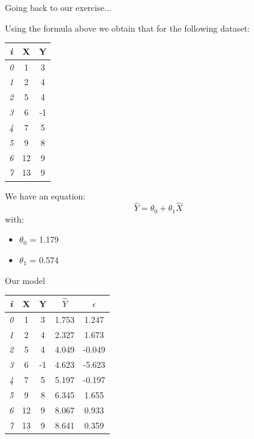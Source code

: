 \documentclass{beamer}
\begin{document}
\begin{frame}
{\centerline{Going back to our exercise... }}

Using the formula above we obtain that for the following dataset:

\begin{table}[h!]
\small
  \begin{center}
    \begin{tabular}{|c|c|c|}      
    \toprule
         \textit{i} & \textbf{X} & \textbf{Y} \\
    \midrule    \midrule
	\textit{0} &1 & 3 \\
	\textit{1} &2 & 4 \\
	\textit{2} &5 & 4 \\
	\textit{3} &6 & -1 \\
	\textit{4} &7 & 5 \\
	\textit{5} &9 & 8 \\
	\textit{6} &12 & 9 \\
	\textit{7} &13 & 9 \\ \bottomrule
    \end{tabular}
  \end{center}
\end{table}


We have an equation:
$$ \hat{Y} = \theta_0 + \theta_1 \hat{X} $$
with:
\begin{itemize}
\item $\theta_0$ = 1.179
\item $\theta_1$ = 0.574

\end{itemize}

\end{frame}

\begin{frame}
{\centerline{Our model }}


\begin{table}[h!]
\small
  \begin{center}
    \begin{tabular}{|c|c|c|c|c|}      
    \toprule
     \textit{i} & \textbf{X} & \textbf{Y} & \textbf{$\hat{Y}$} & \textbf{$\epsilon$}\\
    \midrule    \midrule
	\textit{0} &1 & 3 & 1.753 & 1.247 \\
	\textit{1} &2 & 4 & 2.327 & 1.673 \\
	\textit{2} &5 & 4  & 4.049 & -0.049\\
	\textit{3} &6 & -1 & 4.623 & -5.623 \\
	\textit{4} &7 & 5  & 5.197 & -0.197\\
	\textit{5} &9 & 8  & 6.345 & 1.655\\
	\textit{6} &12 & 9  & 8.067 & 0.933\\
	\textit{7} &13 & 9  & 8.641 & 0.359\\ \bottomrule
    \end{tabular}
  \end{center}
\end{table}


\end{frame}
\end{document}
